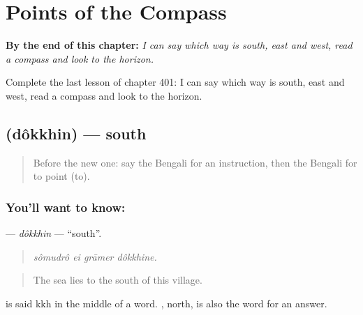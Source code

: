 
\chapter{Points of the Compass}
\label{ch:bn-points-of-the-compass}

\begin{chapteropening}
\textbf{By the end of this chapter:} \emph{I can say which way is south, east and west, read a compass and look to the horizon.}

Complete the last lesson of chapter 401: I can say which way is south, east and west, read a compass and look to the horizon.
\end{chapteropening}

\section[\texorpdfstring{\bn{দক্ষিণ} (dôkkhin)}{দক্ষিণ (dôkkhin)}]{ (dôkkhin) — south}

\label{lesson:BN-C401-dokkhin}



\begin{quote}
Before the new one: say the Bengali for an instruction, then the Bengali for to point (to).
\end{quote}

\subsection*{You'll want to know: }
\textbf{} — \emph{dôkkhin} — \textquotedblleft{}south\textquotedblright{}.

\begin{quote}
   
\end{quote}

\begin{quote}
\emph{sômudrô ei grāmer dôkkhine.}
\end{quote}

\begin{quote}
The sea lies to the south of this village.
\end{quote}

 is said kkh in the middle of a word. , north, is also the word for an answer.

